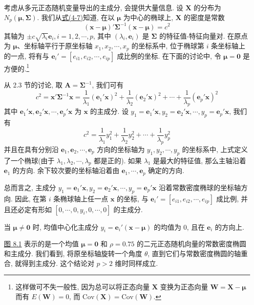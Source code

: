 
考虑从多元正态随机变量导出的主成分, 会提供大量信息. 设 $\mathbf{X}$ 的分布为 $N_p(\boldsymbol{\mu},\boldsymbol{\Sigma})$. 我们从\hyperref[eq:4-7]{式(4-7)}知道, 在以 $\boldsymbol{\mu}$ 为中心的椭球上, $\mathbf{X}$ 的密度是常数
\[
(\mathbf{x}-\boldsymbol{\mu})'\boldsymbol{\Sigma}^{-1}(\mathbf{x}-\boldsymbol{\mu})=c^2
\]
其轴为 $\pm c\sqrt{\lambda_i}\mathbf{e}_i, i=1,2,\cdots,p$, 其中 $(\lambda_i,\mathbf{e}_i)$ 是 $\boldsymbol{\Sigma}$ 的特征值-特征向量对. 在原点为 $\boldsymbol{\mu}$、坐标轴平行于原坐标轴 $x_1,x_2,\cdots,x_p$ 的坐标系中, 位于椭球第 $i$ 条坐标轴上的一点, 将有与 $\mathbf{e}_i'=[e_{i1},e_{i2},\cdots,e_{ip}]$ 成比例的坐标. 在下面的讨论中, 令 $\boldsymbol{\mu}=\mathbf{0}$ 是方便的.\footnote{{\footnotesize 这样做可不失一般性, 因为总可以将正态向量 $\mathbf{X}$ 变换为正态向量 $\mathbf{W}=\mathbf{X}-\boldsymbol{\mu}$ 而有 $E(\mathbf{W})=0$, 而 $\mathrm{Cov}(\mathbf{X})=\mathrm{Cov}(\mathbf{W})$.}}

从 2.3 节的讨论, 取 $\boldsymbol{A}=\boldsymbol{\Sigma}^{-1}$, 我们可有
\[
c^2=\mathbf{x}'\boldsymbol{\Sigma}^{-1}\mathbf{x}=\frac{1}{\lambda_1}(\mathbf{e}_1'\mathbf{x})^2+\frac{1}{\lambda_2}(\mathbf{e}_2'\mathbf{x})^2+\cdots+\frac{1}{\lambda_p}(\mathbf{e}_p'\mathbf{x})^2
\]
其中 $\mathbf{e}_1'\mathbf{x},\mathbf{e}_2'\mathbf{x},\cdots,\mathbf{e}_p'\mathbf{x}$ 为 $\mathbf{x}$ 的主成分. 设 $y_1=\mathbf{e}_1'\mathbf{x}, y_2=\mathbf{e}_2'\mathbf{x},\cdots,y_p=\mathbf{e}_p'\mathbf{x}$, 我们有
\[
c^2=\frac{1}{\lambda_1}y_1^2+\frac{1}{\lambda_2}y_2^2+\cdots+\frac{1}{\lambda_p}y_p^2
\]
并且在具有分别沿 $\mathbf{e}_1,\mathbf{e}_2,\cdots,\mathbf{e}_p$ 方向的坐标轴为 $y_1,y_2,\cdots,y_p$ 的坐标系中, 上式定义了一个椭球(由于 $\lambda_1,\lambda_2,\cdots,\lambda_p$ 都是正的). 如果 $\lambda_1$ 是最大的特征值, 那么主轴沿着 $\mathbf{e}_1$ 的方向. 余下较次要的坐标轴沿着由 $\mathbf{e}_1,\cdots,\mathbf{e}_p$ 确定的方向.

总而言之, 主成分 $y_1=\mathbf{e}_1'\mathbf{x}, y_2=\mathbf{e}_2'\mathbf{x},\cdots,y_p=\mathbf{e}_p'\mathbf{x}$ 沿着常数密度椭球的坐标轴方向. 因此, 在第 $i$ 条椭球轴上任一点 $\mathbf{x}$ 的坐标, 与 $\mathbf{e}_i'=[e_{i1},e_{i2},\cdots,e_{ip}]$ 成比例, 并且还必定有形如 $[0,\cdots,0,y_i,0,\cdots,0]$ 的主成分.

当 $\boldsymbol{\mu}\neq\mathbf{0}$ 时, 均值中心化主成分 $y_i=\mathbf{e}_i'(\mathbf{x}-\boldsymbol{\mu})$ 的均值为 0, 且在 $\mathbf{e}_i$ 的方向上.

\hyperref[fig:8.1]{图 8.1} 表示的是一个均值 $\boldsymbol{\mu}=\mathbf{0}$ 和 $\rho=0.75$ 的二元正态随机向量的常数密度椭圆和主成分. 我们看到, 将原坐标轴旋转一个角度 $\theta$, 直到它们与常数密度椭圆的轴重合, 就得到主成分. 这个结论对 $p>2$ 维时同样成立.

